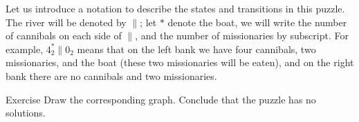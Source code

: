 Let us introduce a notation to describe the states and transitions in this puzzle.
The river will be denoted by ${\parallel}$;
let $*$ denote the boat, we will write the number of cannibals on each side of ${\parallel}$, and the number of missionaries by subscript. 
For example, $4_2^*{\parallel}0_2$ means that on the left bank we have four cannibals, two missionaries, and the boat (these two missionaries will be eaten), and on the right bank there are no cannibals and two missionaries.

\begin{thm}{Exercise}\label{ex:cannibals}
Draw the corresponding graph.
Conclude that the puzzle has no solutions.
\end{thm}
